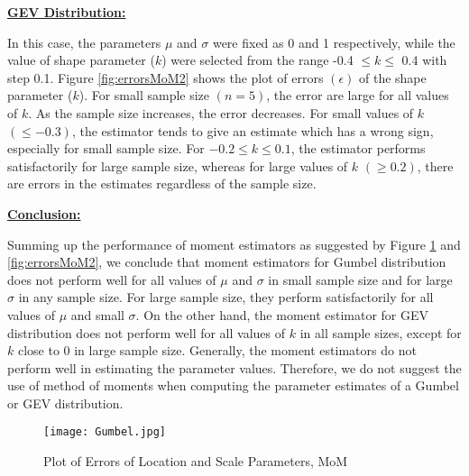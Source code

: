 \documentclass{article}
\begin{document}
\underline{\textbf{GEV Distribution:}}

In this case, the parameters $\mu$ and $\sigma$ were fixed as 0 and 1 respectively, while the value of shape parameter ($k$) were selected from the range -0.4 $\leq k \leq$ 0.4 with step 0.1. Figure \ref{fig:errorsMoM2} shows the plot of errors $(\epsilon)$ of the shape parameter ($k$). For small sample size $(n=5)$, the error are large for all values of $k$. As the sample size increases, the error decreases. For small values of $k$ $(\leq -0.3)$, the estimator tends to give an estimate which has a wrong sign, especially for small sample size. For $-0.2 \leq k \leq 0.1$, the estimator performs satisfactorily for large sample size, whereas for large values of $k$ $(\geq 0.2)$, there are errors in the estimates regardless of the sample size. \vspace{0.3cm} 

\underline{\textbf{Conclusion:}}

Summing up the performance of moment estimators as suggested by Figure \ref{fig:errorsMoM1} and \ref{fig:errorsMoM2}, we conclude that moment estimators for Gumbel distribution does not perform well for all values of $\mu$ and $\sigma$ in small sample size and for large $\sigma$ in any sample size. For large sample size, they perform satisfactorily for all values of $\mu$ and small $\sigma$. On the other hand, the moment estimator for GEV distribution does not perform well for all values of $k$ in all sample sizes, except for $k$ close to 0 in large sample size. Generally, the moment estimators do not perform well in estimating the parameter values. Therefore, we do not suggest the use of method of moments when computing the parameter estimates of a Gumbel or GEV distribution.

\begin{figure}
\begin{center}
\texttt{[image: Gumbel.jpg]} 
\caption{Plot of Errors of Location and Scale Parameters, MoM}
\label{fig:errorsMoM1}
\end{center}
\end{figure}
\end{document}
